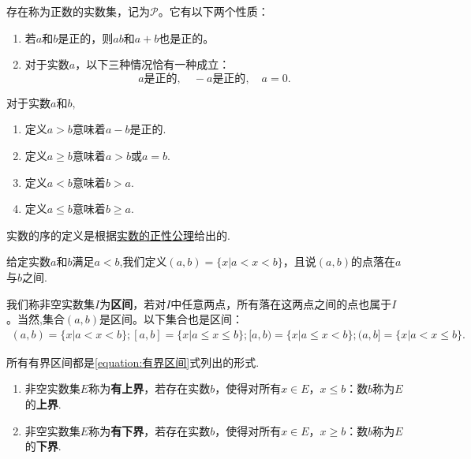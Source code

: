 \documentclass[lang=cn,newtx,10pt,scheme=chinese]{../Template/elegantbook}
\begin{document}
\begin{axiom}[正性公理]\label{axiom:正性公理}
存在称为正数的实数集，记为\(\mathcal{P}\)。它有以下两个性质：
\begin{enumerate}[(1)]
  \item 若\(a\)和\(b\)是正的，则\(ab\)和\(a + b\)也是正的。

  \item 对于实数\(a\)，以下三种情况恰有一种成立：
\[a\text{是正的},\quad -a\text{是正的},\quad a = 0.\]
\end{enumerate}
\end{axiom}

\begin{definition}[实数的序]\label{definition:实数的序}
对于实数\(a\)和\(b\),
\begin{enumerate}
  \item 定义\(a>b\)意味着\(a - b\)是正的.
  \item 定义\(a\geqslant b\)意味着\(a>b\)或\(a = b\).
  \item 定义\(a<b\)意味着\(b>a\).
  \item 定义\(a\leqslant b\)意味着\(b\geqslant a\).
\end{enumerate}
\end{definition}
\begin{remark}
  实数的序的定义是根据\hyperref[axiom:正性公理]{实数的正性公理}给出的.
\end{remark}

\begin{definition}[实数的区间]\label{definition:实数的区间}
  给定实数\(a\)和\(b\)满足\(a<b\),我们定义\((a, b)=\{x|a<x<b\}\)，且说\((a, b)\)的点落在\(a\)与\(b\)之间.

  我们称非空实数集\(I\)为\textbf{区间}，若对\(I\)中任意两点，所有落在这两点之间的点也属于\(I\)。当然,集合\((a, b)\)是区间。以下集合也是区间：
  \begin{align}\label{equation:有界区间}
    (a, b)=\{x|a<x<b\};[a,b] = \{x|a\leqslant x\leqslant b\};[a,b) = \{x|a\leqslant x<b\};(a,b] = \{x|a<x\leqslant b\}.
  \end{align}
\end{definition}
\begin{note}
  所有有界区间都是\eqref{equation:有界区间}式列出的形式.
\end{note}

\begin{definition}[上界和下界]\label{definition:上界和下界}
\begin{enumerate}
  \item 非空实数集\(E\)称为\textbf{有上界}，若存在实数\(b\)，使得对所有\(x\in E\)，\(x\leqslant b\)：数\(b\)称为\(E\)的\textbf{上界}.
  \item 非空实数集\(E\)称为\textbf{有下界}，若存在实数\(b\)，使得对所有\(x\in E\)，\(x\geqslant b\)：数\(b\)称为\(E\)的\textbf{下界}.
\end{enumerate}
\end{definition}
\end{document}
